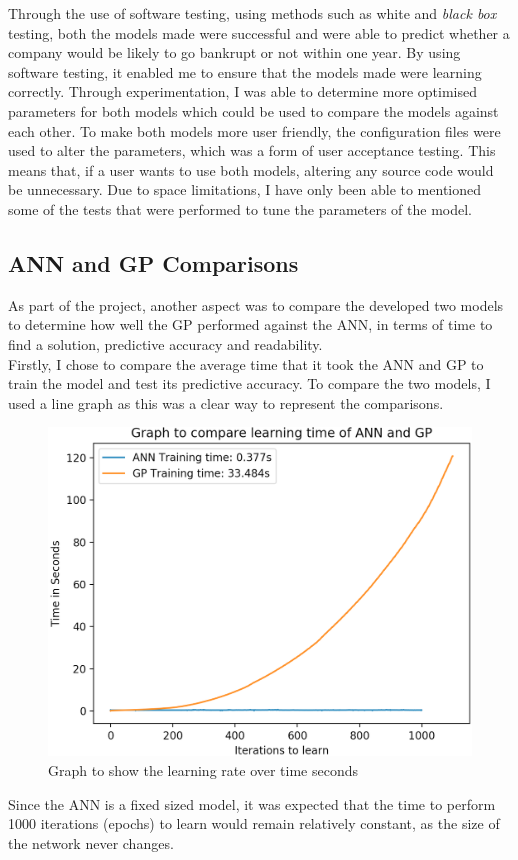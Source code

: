 \documentclass[11pt]{article}
\begin{document}
Through the use of software testing, using methods such as white and \textit{black box} testing, both the models made were successful and were able to predict whether a company would be likely to go bankrupt or not within one year. By using software testing, it enabled me to ensure that the models made were learning correctly. Through experimentation, I was able to determine more optimised parameters for both models which could be used to compare the models against each other. To make both models more user friendly, the configuration files were used to alter the parameters, which was a form of user acceptance testing. This means that, if a user wants to use both models, altering any source code would be unnecessary. Due to space limitations, I have only been able to mentioned some of the tests that were performed to tune the parameters of the model. \\
\subsection{ANN and GP Comparisons}\label{subsec:ANNGPC}
As part of the project, another aspect was to compare the developed two models to determine how well the GP performed against the ANN, in terms of time to find a solution, predictive accuracy and readability. \\

Firstly, I chose to compare the average time that it took the ANN and GP to train the model and test its predictive accuracy. To compare the two models, I used a line graph as this was a clear way to represent the comparisons.

\begin{figure}[h]
\centering
\includegraphics[scale = .45]{learning_rates}
\caption{Graph to show the learning rate over time seconds} 
\end{figure}
Since the ANN is a fixed sized model, it was expected that the time to perform 1000 iterations (epochs) to learn would remain relatively constant, as the size of the network never changes. 
\end{document}

